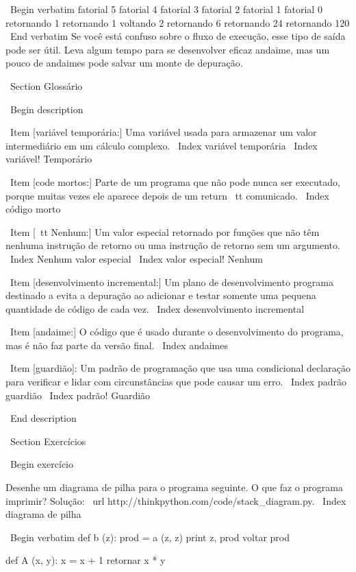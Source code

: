 \documentclass[10pt]{book}
\begin{document}
{{{{\ Begin {verbatim}
                     fatorial 5
                 fatorial 4
             fatorial 3
         fatorial 2
     fatorial 1
 fatorial 0
 retornando 1
     retornando 1
         voltando 2
             retornando 6
                 retornando 24
                     retornando 120
\ End {verbatim}
%
Se você está confuso sobre o fluxo de execução, esse tipo de
saída pode ser útil. Leva algum tempo para se desenvolver eficaz
andaime, mas um pouco de andaimes pode salvar um monte de depuração.


\ Section {} Glossário

\ Begin {description}

\ Item [variável temporária:] Uma variável usada para armazenar um valor intermediário em
um cálculo complexo.
\ Index {variável temporária}
\ Index {variável! Temporário}

\ Item [code mortos:] Parte de um programa que não pode nunca ser executado, porque muitas vezes
ele aparece depois de um {return \ tt} comunicado.
\ Index {código morto}

\ Item [{\ tt Nenhum}:] Um valor especial retornado por funções que
não têm nenhuma instrução de retorno ou uma instrução de retorno sem um argumento.
\ Index {Nenhum valor especial}
\ Index {valor especial! Nenhum}

\ Item [desenvolvimento incremental:] Um plano de desenvolvimento programa destinado a
evita a depuração ao adicionar e testar somente
uma pequena quantidade de código de cada vez.
\ Index {desenvolvimento incremental}

\ Item [andaime:] O código que é usado durante o desenvolvimento do programa, mas é
não faz parte da versão final.
\ Index {} andaimes

\ Item [guardião]: Um padrão de programação que usa uma condicional
declaração para verificar e lidar com circunstâncias que
pode causar um erro.
\ Index {padrão guardião}
\ Index {padrão! Guardião}

\ End {description}


\ Section {Exercícios}

\ Begin {} exercício

Desenhe um diagrama de pilha para o programa seguinte. O que faz o programa imprimir?
Solução: \ url {http://thinkpython.com/code/stack_diagram.py}.
\ Index {diagrama de pilha}

\ Begin {verbatim}
def b (z):
    prod = a (z, z)
    print z, prod
    voltar prod

def A (x, y):
    x = x + 1
    retornar x * y

}}}}
\end{document}
